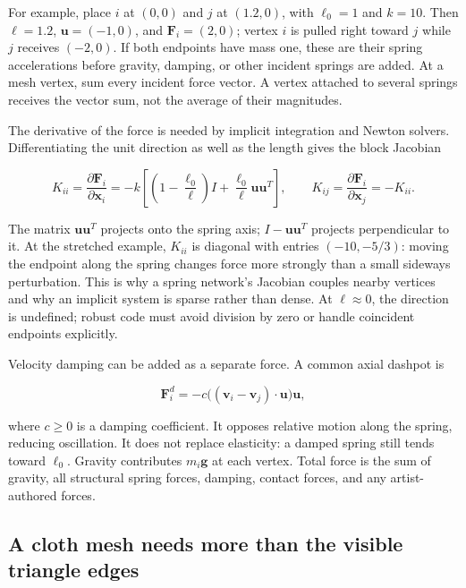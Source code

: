 For example, place \(i\) at \((0,0)\) and \(j\) at \((1.2,0)\), with \(\ell_0=1\) and \(k=10\). Then \(\ell=1.2\), \(\boldsymbol{u}=(-1,0)\), and \(\boldsymbol{F}_i=(2,0)\); vertex \(i\) is pulled right toward \(j\) while \(j\) receives \((-2,0)\). If both endpoints have mass one, these are their spring accelerations before gravity, damping, or other incident springs are added. At a mesh vertex, sum every incident force vector. A vertex attached to several springs receives the vector sum, not the average of their magnitudes.

The derivative of the force is needed by implicit integration and Newton solvers. Differentiating the unit direction as well as the length gives the block Jacobian

\[
K_{ii}=\frac{\partial\boldsymbol{F}_i}{\partial\boldsymbol{x}_i}
=-k\left[\left(1-\frac{\ell_0}{\ell}\right)I
+\frac{\ell_0}{\ell}\boldsymbol{u}\boldsymbol{u}^{T}\right],
\qquad
K_{ij}=\frac{\partial\boldsymbol{F}_i}{\partial\boldsymbol{x}_j}=-K_{ii}.
\]

The matrix \(\boldsymbol{u}\boldsymbol{u}^{T}\) projects onto the spring axis; \(I-\boldsymbol{u}\boldsymbol{u}^{T}\) projects perpendicular to it. At the stretched example, \(K_{ii}\) is diagonal with entries \((-10,-5/3)\): moving the endpoint along the spring changes force more strongly than a small sideways perturbation. This is why a spring network's Jacobian couples nearby vertices and why an implicit system is sparse rather than dense. At \(\ell\approx0\), the direction is undefined; robust code must avoid division by zero or handle coincident endpoints explicitly.

Velocity damping can be added as a separate force. A common axial dashpot is

\[
\boldsymbol{F}^{d}_i=-c\big((\boldsymbol{v}_i-\boldsymbol{v}_j)\cdot\boldsymbol{u}\big)\boldsymbol{u},
\]

where \(c\ge0\) is a damping coefficient. It opposes relative motion along the spring, reducing oscillation. It does not replace elasticity: a damped spring still tends toward \(\ell_0\). Gravity contributes \(m_i\boldsymbol{g}\) at each vertex. Total force is the sum of gravity, all structural spring forces, damping, contact forces, and any artist-authored forces.

\subsection{A cloth mesh needs more than the visible triangle edges}\label{04-visual-computing-ii-ch029-a-cloth-mesh-needs-more-than-the-visible-triangle-edges}

